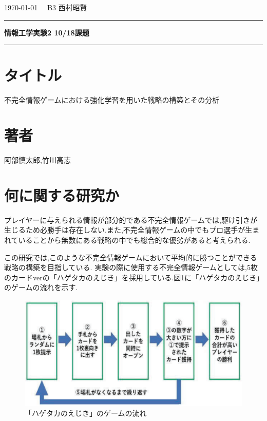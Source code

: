 \documentclass{jarticle}     %
\begin{document}
  \onecolumn
  \noindent
  \hspace{1em}

  \today
  \hfill
  \ \  B3 西村昭賢 

  \vspace{2mm}
  \hrule
  \begin{center}
  {\Large \bf 情報工学実験2 10/18課題}
  \end{center}
  \hrule
  \vspace{3mm}


\section*{タイトル}
不完全情報ゲームにおける強化学習を用いた戦略の構築とその分析\cite{1}

\section*{著者}
阿部慎太郎,竹川高志

\section*{何に関する研究か}
プレイヤーに与えられる情報が部分的である不完全情報ゲームでは,駆け引きが生じるため必勝手は存在しない.また,不完全情報ゲームの中でもプロ選手が生まれていることから無数にある戦略の中でも総合的な優劣があると考えられる.\par
この研究では,このような不完全情報ゲームにおいて平均的に勝つことができる戦略の構築を目指している.
実験の際に使用する不完全情報ゲームとしては,5枚のカードverの「ハゲタカのえじき」を採用している.図1に「ハゲタカのえじき」のゲームの流れを示す.\par

\begin{figure}[ht]
  \centering
  \includegraphics[width=120mm]{assets/Figure1.eps}
  \caption{「ハゲタカのえじき」のゲームの流れ}
  \label{fig:GameFlow of HAGETAKA}
\end{figure}
\end{document}
